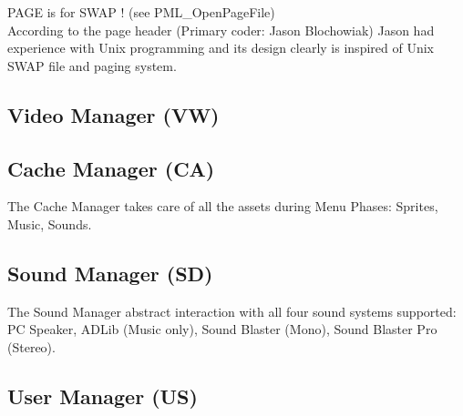 \documentclass[book.tex]{subfiles}
\begin{document}
PAGE is for SWAP ! (see PML\_OpenPageFile)\\
According to the page header (Primary coder: Jason Blochowiak) Jason had experience with Unix programming and its design clearly is inspired of Unix SWAP file and paging system.
\subsection{Video Manager (VW)}


\subsection{Cache Manager (CA)}
The Cache Manager takes care of all the assets during Menu Phases: Sprites, Music, Sounds.
\subsection{Sound Manager (SD)}
The Sound Manager abstract interaction with all four sound systems supported: PC Speaker, ADLib (Music only), Sound Blaster (Mono), Sound Blaster Pro (Stereo).
\subsection{User Manager (US)}

  
\end{document}
